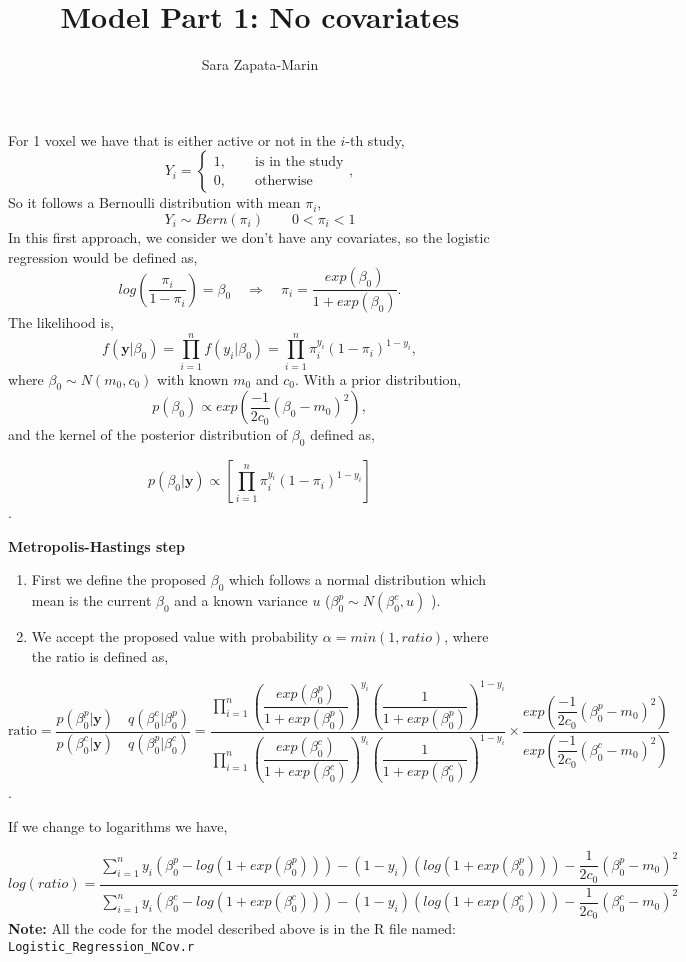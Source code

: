 \documentclass[10pt,a4paper]{article}
\title{Model Part 1: No covariates}
\author{Sara Zapata-Marin}
\begin{document}
\maketitle

For 1 voxel we have that is either active or not in the $i$-th study,
\[ Y_i= 
\begin{cases}
1,\qquad \text{is in the study}\\
0, \qquad \text{otherwise}
\end{cases},
\]
So it follows a Bernoulli distribution with mean $\pi_i$,
\[Y_i \sim Bern(\pi_i) \qquad 0<\pi_i <1\]
In this first approach, we consider we don't have any covariates, so the logistic regression would be defined as,
\[ log \left(\dfrac{\pi_i}{1-\pi_i} \right)=\beta_0 \quad \Rightarrow  \quad \pi_i = \dfrac{exp(\beta_0)}{1+ exp(\beta_0)}. \]
The likelihood is,
\[ f(\textbf{y}| \beta_0)= \prod_{i=1}^{n} f(y_i| \beta_0)=\prod_{i=1}^{n} \pi_i^{y_i}(1-\pi_i)^{1-y_i},\]
where $ \beta_0 \sim N(m_0,c_0) $ with known $m_0$ and $c_0$.
With a prior distribution,
\[
p(\beta_0)\propto exp\left( \dfrac{-1}{2c_0}(\beta_0-m_0)^2 \right),
\]
and the kernel of the posterior distribution of $\beta_0$ defined as,

\[p(\beta_0|\textbf{y})\propto \left[ \prod_{i=1}^{n} \pi_i^{y_i}(1-\pi_i)^{1-y_i} \right]\].

\textbf{Metropolis-Hastings step}

\begin{enumerate}
\item First we define the proposed $\beta_0$ which follows a normal distribution which mean is the current $\beta_0$ and a known variance $u$ ($\beta_0^p \sim N(\beta_0^c,u)$ ).
\item We accept the proposed value with probability $\alpha = min(1, ratio)$, where the ratio is defined as,
\end{enumerate}

\[ \text{ratio}=\dfrac{p(\beta_0^p|\textbf{y})\quad q(\beta_0^c|\beta_0^p)}{p(\beta_0^c|\textbf{y}) \quad q(\beta_0^p|\beta_0^c)}=\dfrac{\prod_{i=1}^n\left(\dfrac{exp(\beta_0^p)}{1+exp(\beta_0^p)}\right)^{y_i}\left( \dfrac{1}{1+exp(\beta_0^p)}\right)^{1-y_i}}{\prod_{i=1}^n\left(\dfrac{exp(\beta_0^c)}{1+exp(\beta_0^c)}\right)^{y_i}\left( \dfrac{1}{1+exp(\beta_0^c)}\right)^{1-y_i}}\times \dfrac{exp\left(\dfrac{-1}{2c_0}(\beta_0^p-m_0)^2\right)}{exp\left(\dfrac{-1}{2c_0}(\beta_0^c-m_0)^2\right)}\].

If we change to logarithms we have,

\[ log(ratio)=
 \dfrac{\sum_{i=1}^n y_i(\beta_0^p-log(1+exp(\beta_0^p)))- (1-y_i)(log(1+exp(\beta_0^p)))-\dfrac{1}{2c_0}(\beta_0^p-m_0)^2}{\sum_{i=1}^n y_i(\beta_0^c-log(1+exp(\beta_0^c)))- (1-y_i)(log(1+exp(\beta_0^c)))-\dfrac{1}{2c_0}(\beta_0^c-m_0)^2}
\]
\textbf{Note:} All the code for the model described above is in the R file named: \texttt{Logistic\_Regression\_NCov.r}
\end{document}
